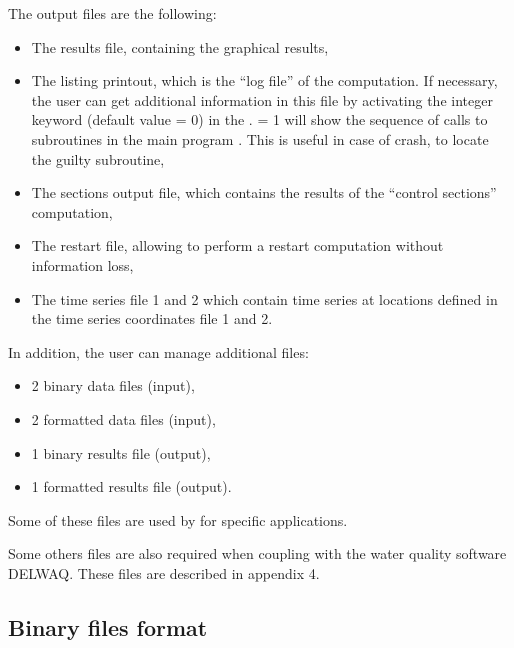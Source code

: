 The output files are the following:

\begin{itemize}
\item The results file, containing the graphical results,

\item The listing printout, which is the ``log file'' of the computation.
If necessary, the user can get additional information in this file by activating
the integer keyword  (default value = 0) in the
.
 = 1 will show the sequence of calls to subroutines in the main
program .
This is useful in case of crash, to locate the guilty subroutine,

\item The sections output file, which contains the results of the
``control sections'' computation,

\item The restart file, allowing to perform a restart computation without
information loss,

\item The time series file 1 and 2 which contain time series at locations
defined in the time series coordinates file 1 and 2.
\end{itemize}

In addition, the user can manage additional files:

\begin{itemize}
\item 2 binary data files (input),

\item 2 formatted data files (input),

\item 1 binary results file (output),

\item 1 formatted results file (output).
\end{itemize}

Some of these files are used by  for specific applications.

Some others files are also required when coupling  with the water
quality software DELWAQ.
These files are described in appendix 4.


\subsection{Binary files format}
\label{subs:binfile}

